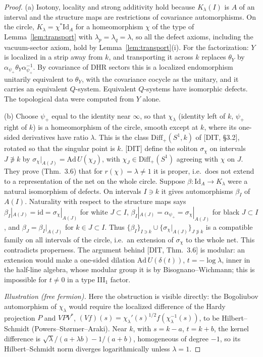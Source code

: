 \documentclass[11pt]{article}
\theoremstyle{definition}
\theoremstyle{remark}
\newcommand{\Id}{\mathrm{Id}}
\begin{document}
\begin{proof}
(a) Isotony, locality and strong additivity hold because $K_\lambda(I)$ is $A$ of an interval and the structure maps are restrictions of covariance automorphisms. On the circle, $K_\lambda=\chi^*\Id_A$ for a homeomorphism $\chi$ of the type of Lemma~\ref{lem:transport} with $\lambda_p=\lambda_q=\lambda$, so all the defect axioms, including the vacuum-sector axiom, hold by Lemma~\ref{lem:transport}(i). For the factorization: $Y$ is localized in a strip away from $k$, and transporting it across $k$ replaces $\theta_Y$ by $\alpha_{\psi_+}\theta_Y\alpha_{\psi_+}^{-1}$. By covariance of DHR sectors this is a localized endomorphism unitarily equivalent to $\theta_Y$, with the covariance cocycle as the unitary, and it carries an equivalent $Q$-system. Equivalent $Q$-systems have isomorphic defects. The topological data were computed from $Y$ alone.

(b) Choose $\psi_+$ equal to the identity near $\infty$, so that $\chi_\lambda$ (identity left of $k$, $\psi_+$ right of $k$) is a homeomorphism of the circle, smooth except at $k$, where its one-sided derivatives have ratio $\lambda$. This is the class $\mathrm{Diff}_+(S^1,k)$ of [DIT, \S3.2], rotated so that the singular point is $k$. [DIT] define the soliton $\sigma_{\chi}$ on intervals $J\not\ni k$ by $\sigma_\chi|_{A(J)}=\mathrm{Ad}\,U(\chi_J)$, with $\chi_J\in\mathrm{Diff}_+(S^1)$ agreeing with $\chi$ on $J$. They prove (Thm.~3.6) that for $r(\chi)=\lambda\ne1$ it is proper, i.e.\ does not extend to a representation of the net on the whole circle. Suppose $\beta\colon\Id_A\to K_\lambda$ were a natural isomorphism of defects. On intervals $I\ni k$ it gives automorphisms $\beta_I$ of $A(I)$. Naturality with respect to the structure maps says $\beta_I|_{A(J)}=\mathrm{id}=\sigma_\chi|_{A(J)}$ for white $J\subset I$, $\beta_I|_{A(J)}=\alpha_{\psi_+}=\sigma_\chi|_{A(J)}$ for black $J\subset I$, and $\beta_J=\beta_I|_{A(J)}$ for $k\in J\subset I$. Thus $\{\beta_I\}_{I\ni k}\cup\{\sigma_\chi|_{A(J)}\}_{J\not\ni k}$ is a compatible family on all intervals of the circle, i.e.\ an extension of $\sigma_\chi$ to the whole net. This contradicts properness. The argument behind [DIT, Thm.~3.6] is modular: an extension would make a one-sided dilation $\mathrm{Ad}\,U(\delta(t))$, $t=-\log\lambda$, inner in the half-line algebra, whose modular group it is by Bisognano--Wichmann; this is impossible for $t\ne0$ in a type III$_1$ factor.

\emph{Illustration (free fermion).} Here the obstruction is visible directly: the Bogoliubov automorphism of $\chi_\lambda$ would require the localized difference of the Hardy projection $P$ and $VPV^*$, $(Vf)(s)=\chi_\lambda'(s)^{1/2}f(\chi_\lambda^{-1}(s))$, to be Hilbert--Schmidt (Powers--St{\o}rmer--Araki). Near $k$, with $s=k-a$, $t=k+b$, the kernel difference is $\sqrt\lambda/(a+\lambda b)-1/(a+b)$, homogeneous of degree $-1$, so its Hilbert--Schmidt norm diverges logarithmically unless $\lambda=1$.


\end{proof}
\end{document}
